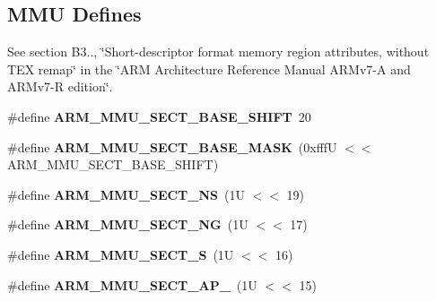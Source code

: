 \subsection*{M\+MU Defines}
\label{_amgrpa3701f2970828d8e4257fedf8cc417d2}%
See section B3.., \char`\"{}\+Short-\/descriptor format memory region attributes,
without T\+E\+X remap\char`\"{} in the \char`\"{}\+A\+R\+M Architecture Reference Manual A\+R\+Mv7-\/\+A and
\+A\+R\+Mv7-\/\+R edition\char`\"{}. \begin{DoxyCompactItemize}
\item 
\mbox{\label{group__RTEMSScoreCPUARMCP15_ga84c14d9530ef984247b3dba6537622aa}} 
\#define {\bfseries A\+R\+M\+\_\+\+M\+M\+U\+\_\+\+S\+E\+C\+T\+\_\+\+B\+A\+S\+E\+\_\+\+S\+H\+I\+FT}~20
\item 
\mbox{\label{group__RTEMSScoreCPUARMCP15_gadac06430806675ce8a5e168207a36966}} 
\#define {\bfseries A\+R\+M\+\_\+\+M\+M\+U\+\_\+\+S\+E\+C\+T\+\_\+\+B\+A\+S\+E\+\_\+\+M\+A\+SK}~(0xfff\+U $<$$<$ A\+R\+M\+\_\+\+M\+M\+U\+\_\+\+S\+E\+C\+T\+\_\+\+B\+A\+S\+E\+\_\+\+S\+H\+I\+F\+T)
\item 
\mbox{\label{group__RTEMSScoreCPUARMCP15_gab87bde3f2b2fe31742f44fb8e77d564e}} 
\#define {\bfseries A\+R\+M\+\_\+\+M\+M\+U\+\_\+\+S\+E\+C\+T\+\_\+\+NS}~(1\+U $<$$<$ 19)
\item 
\mbox{\label{group__RTEMSScoreCPUARMCP15_ga16a4007adbbb06e589164b913f384209}} 
\#define {\bfseries A\+R\+M\+\_\+\+M\+M\+U\+\_\+\+S\+E\+C\+T\+\_\+\+NG}~(1\+U $<$$<$ 17)
\item 
\mbox{\label{group__RTEMSScoreCPUARMCP15_gafcd12450f9600aa0b1deb7a3b5769973}} 
\#define {\bfseries A\+R\+M\+\_\+\+M\+M\+U\+\_\+\+S\+E\+C\+T\+\_\+S}~(1\+U $<$$<$ 16)
\item 
\mbox{\label{group__RTEMSScoreCPUARMCP15_ga545b5b50258a75e1df36ddb273830280}} 
\#define {\bfseries A\+R\+M\+\_\+\+M\+M\+U\+\_\+\+S\+E\+C\+T\+\_\+\+A\+P\+\_}~(1\+U $<$$<$ 15)
\item 
\mbox{\label{group__RTEMSScoreCPUARMCP15_gaa9b3386fc0598f90ca42be0900824ff8}} 
$$
\end{DoxyCompactItemize}
